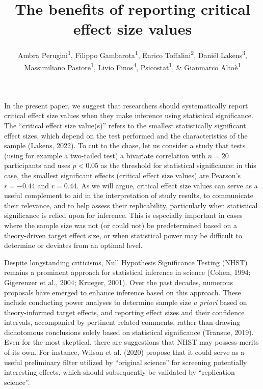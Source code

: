 \documentclass[
  man]{apa7}
\title{The benefits of reporting critical effect size values}
\author{Ambra Perugini\textsuperscript{1}, Filippo Gambarota\textsuperscript{1}, Enrico Toffalini\textsuperscript{2}, Daniël Lakens\textsuperscript{3}, Massimiliano Pastore\textsuperscript{1}, Livio Finos\textsuperscript{4}, Psicostat\textsuperscript{1}, \& Gianmarco Altoè\textsuperscript{1}}
\date{}
\affiliation{\vspace{0.5cm}\textsuperscript{1} Department of Developmental and Social Psychology, University of Padova, Italy\\\textsuperscript{2} Department of General Psychology, University of Padova, Italy\\\textsuperscript{3} Eindhoven University of Technology, Netherlands\\\textsuperscript{4} Department of Statistics, University of Padova, Italy}
\begin{document}
\maketitle

In the present paper, we suggest that researchers should systematically report critical effect size values when they make inference using statistical significance. The ``critical effect size value(s)'' refers to the smallest statistically significant effect sizes, which depend on the test performed and the characteristics of the sample (Lakens, 2022). To cut to the chase, let us consider a study that tests (using for example a two-tailed test) a bivariate correlation with \(n = 20\) participants and uses \(p < 0.05\) as the threshold for statistical significance: in this case, the smallest significant effects (critical effect size values) are Pearson's \(r = -0.44\) and \(r = 0.44\). As we will argue, critical effect size values can serve as a useful complement to aid in the interpretation of study results, to communicate their relevance, and to help assess their replicability, particularly when statistical significance is relied upon for inference. This is especially important in cases where the sample size was not (or could not) be predetermined based on a theory-driven target effect size, or when statistical power may be difficult to determine or deviates from an optimal level.

Despite longstanding criticisms, Null Hypothesis Significance Testing (NHST) remains a prominent approach for statistical inference in science (Cohen, 1994; Gigerenzer et al., 2004; Krueger, 2001). Over the past decades, numerous proposals have emerged to enhance inference based on this approach. These include conducting power analyses to determine sample size \textit{a priori} based on theory-informed target effects, and reporting effect sizes and their confidence intervals, accompanied by pertinent related comments, rather than drawing dichotomous conclusions solely based on statistical significance (Transue, 2019). Even for the most skeptical, there are suggestions that NHST may possess merits of its own. For instance, Wilson et al. (2020) propose that it could serve as a useful preliminary filter utilized by ``original science'' for screening potentially interesting effects, which should subsequently be validated by ``replication science''.
\end{document}
